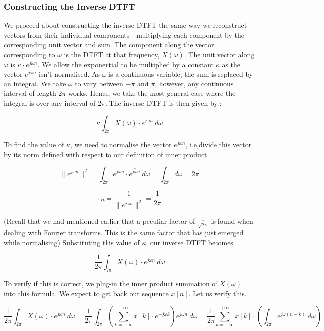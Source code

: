 \documentclass{article}
\theoremstyle{definition}
\begin{document}
\subsubsection{Constructing the Inverse DTFT}

We proceed about constructing the inverse DTFT the same way we reconstruct vectors from their individual components - multiplying each component by the corresponding unit vector and sum. The component along the vector corresponding to $\omega$ is the DTFT at that frequency, $X(\omega)$. The unit vector along $\omega$ is $\kappa \cdot e^{j\omega n}$. We allow the exponential to be multiplied by a constant $\kappa$ as the vector $e^{j\omega n}$ isn't normalised. As $\omega$ is a continuous variable, the sum is replaced by an integral. We take $\omega$ to vary between $-\pi$ and $\pi$, however, any continuous interval of length $2\pi$ works. Hence, we take the most general case where the integral is over any interval of $2\pi$. The inverse DTFT is then given by :

\[
	\kappa \int_{2\pi} X(\omega) \cdot e^{j\omega n}\: d\omega
\]

To find the value of $\kappa$, we need to normalise the vector $e^{j\omega n}$, i.e,divide this vector by its norm defined with respect to our definition of inner product. 

\[
	\|e^{j\omega n}\|^2 = \int_{2\pi} e^{j\omega n} \cdot \overline{e^{j\omega n}} \: d\omega = \int_{2\pi} d\omega = 2\pi
\]

\[
	\therefore \kappa = \frac{1}{\| e^{j\omega n} \|^2} = \frac{1}{2\pi}
\]

(Recall that we had mentioned earlier that a peculiar factor of $\frac{1}{\sqrt{2\pi}}$ is found when dealing with Fourier transforms. This is the same factor that has just emerged while normalising) Substituting this value of $\kappa$, our inverse DTFT becomes 

\[
	\frac{1}{2\pi} \int_{2\pi} X(\omega) \cdot e^{j\omega n} \: d\omega
\]

To verify if this is correct, we plug-in the inner product summation of $X(\omega)$ into this formula. We expect to get back our sequence $x[n]$. Let us verify this.

\[
	\frac{1}{2\pi} \int_{2\pi} X(\omega) \cdot e^{j\omega n} \: d\omega = \frac{1}{2\pi} \int_{2\pi} \left( \sum_{k = -\infty}^{+\infty} x[k] \cdot e^{-j\omega k} \right) e^{j\omega n} \: d\omega = \frac{1}{2\pi} \sum_{k = -\infty}^{+\infty} x[k] \cdot \left(\int_{2\pi} e^{j\omega(n-k)} \: d\omega \right)
\]
\end{document}
